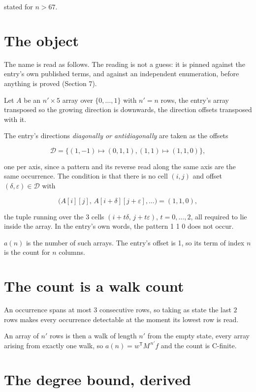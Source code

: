 \documentclass[11pt]{article}
\theoremstyle{definition}
\begin{document}
stated for $n > 67$.

\section{The object}

The name is read as follows. The reading is not a guess: it is pinned against the entry's own published terms, and against an independent enumeration, before anything is proved (Section 7).

Let $A$ be an $n' \times 5$ array over $\{0,\dots,1\}$ with $n' = n$ rows, the entry's array transposed so the growing direction is downwards, the direction offsets transposed with it.

The entry's directions {\itshape diagonally or antidiagonally} are taken as the offsets

\[\mathcal{D} = \{(1,-1)\mapsto(0,1,1), (1,1)\mapsto(1,1,0)\},\]

one per axis, since a pattern and its reverse read along the same axis are the same occurrence. The condition is that there is no cell $(i,j)$ and offset $(\delta,\varepsilon)\in\mathcal{D}$ with

\[\bigl(A[i][j],\,A[i{+}\delta][j{+}\varepsilon],\dots\bigr) = (1, 1, 0),\]

the tuple running over the $3$ cells $(i+t\delta,\,j+t\varepsilon)$, $t = 0,\dots,2$, all required to lie inside the array. In the entry's own words, the pattern 1 1 0 does not occur.

$a(n)$ is the number of such arrays. The entry's offset is 1, so its term of index $n$ is the count for $n$ columns.

\section{The count is a walk count}

An occurrence spans at most $3$ consecutive rows, so taking as state the last $2$ rows makes every occurrence detectable at the moment its lowest row is read.

An array of $n'$ rows is then a walk of length $n'$ from the empty state, every array arising from exactly one walk, so $a(n) = w^{\mathsf T}M^{\,n'}f$ and the count is C-finite.

\section{The degree bound, derived}
\end{document}
